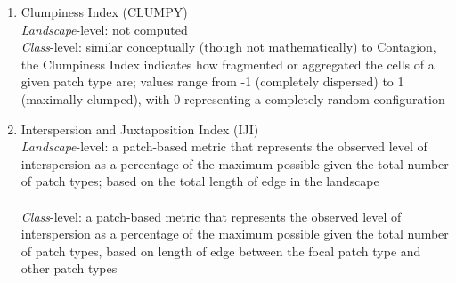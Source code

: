 \begin{enumerate}
		
	\item Clumpiness Index (CLUMPY)\\
	\emph{Landscape}-level: not computed  	\\
	\emph{Class}-level: similar conceptually (though not mathematically) to Contagion, the Clumpiness Index indicates how fragmented or aggregated the cells of a given patch type are; values range from -1 (completely dispersed) to 1 (maximally clumped), with 0 representing a completely random configuration 	\\
	
	\item Interspersion and Juxtaposition Index (IJI) \\
	\emph{Landscape}-level: a patch-based metric that represents the observed level of interspersion as a percentage of the maximum possible given the total number of patch types; based on the total length of edge in the landscape 	\\
	\\
	\emph{Class}-level: a patch-based metric that represents the observed level of interspersion as a percentage of the maximum possible given the  total number of patch types, based on length of edge between the focal patch type and other patch types 	\\
	

\end{enumerate}
